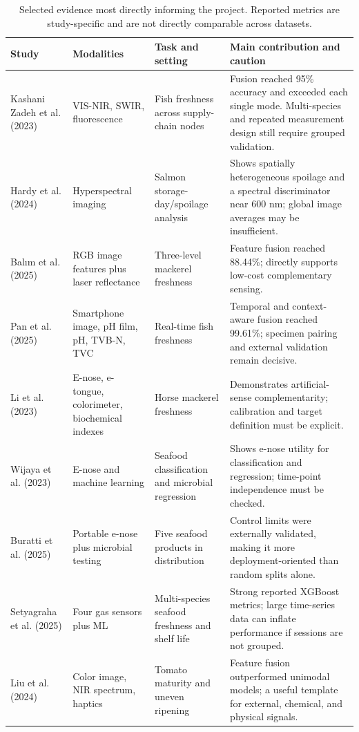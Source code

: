 \documentclass[11pt]{article}
\begin{document}
\begin{table}[H]
\centering
\caption{Selected evidence most directly informing the project. Reported metrics are study-specific and are not directly comparable across datasets.}
\label{tab:evidence}
\scriptsize
\begin{tabularx}{\textwidth}{P{0.19\textwidth}P{0.18\textwidth}P{0.25\textwidth}Y}
\toprule
\textbf{Study} & \textbf{Modalities} & \textbf{Task and setting} & \textbf{Main contribution and caution}\\
\midrule
Kashani Zadeh et al. (2023) & VIS-NIR, SWIR, fluorescence & Fish freshness across supply-chain nodes & Fusion reached 95\% accuracy and exceeded each single mode. Multi-species and repeated measurement design still require grouped validation.\\
Hardy et al. (2024) & Hyperspectral imaging & Salmon storage-day/spoilage analysis & Shows spatially heterogeneous spoilage and a spectral discriminator near 600 nm; global image averages may be insufficient.\\
Balım et al. (2025) & RGB image features plus laser reflectance & Three-level mackerel freshness & Feature fusion reached 88.44\%; directly supports low-cost complementary sensing.\\
Pan et al. (2025) & Smartphone image, pH film, pH, TVB-N, TVC & Real-time fish freshness & Temporal and context-aware fusion reached 99.61\%; specimen pairing and external validation remain decisive.\\
Li et al. (2023) & E-nose, e-tongue, colorimeter, biochemical indexes & Horse mackerel freshness & Demonstrates artificial-sense complementarity; calibration and target definition must be explicit.\\
Wijaya et al. (2023) & E-nose and machine learning & Seafood classification and microbial regression & Shows e-nose utility for classification and regression; time-point independence must be checked.\\
Buratti et al. (2025) & Portable e-nose plus microbial testing & Five seafood products in distribution & Control limits were externally validated, making it more deployment-oriented than random splits alone.\\
Setyagraha et al. (2025) & Four gas sensors plus ML & Multi-species seafood freshness and shelf life & Strong reported XGBoost metrics; large time-series data can inflate performance if sessions are not grouped.\\
Liu et al. (2024) & Color image, NIR spectrum, haptics & Tomato maturity and uneven ripening & Feature fusion outperformed unimodal models; a useful template for external, chemical, and physical signals.\\

\end{tabularx}
\end{table}
\end{document}

